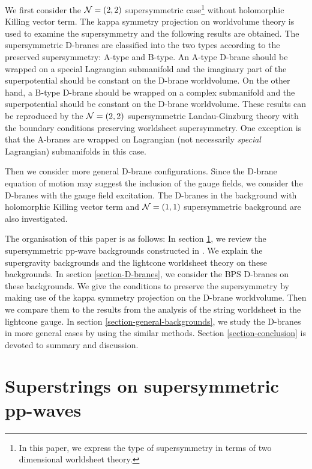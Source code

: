 \documentclass[a4paper,12pt]{article}
\numberwithin{equation}{section}
\begin{document}
We first consider the ${\cal N}=(2,2)$ supersymmetric case\footnote{
In this paper, we express the type of supersymmetry in terms of two
dimensional worldsheet theory.
} without
holomorphic Killing vector term. 
The kappa symmetry projection on worldvolume theory is used to examine
the supersymmetry and the following results are obtained.
The supersymmetric D-branes are classified into the two types according
to the preserved supersymmetry: A-type and B-type.
An A-type D-brane should be wrapped on a special Lagrangian submanifold and
the imaginary part of the superpotential should be constant on the
D-brane worldvolume. 
On the other hand, a B-type D-brane should be wrapped on a complex
submanifold and the superpotential should be constant on the D-brane
worldvolume. 
These results can be reproduced by the 
${\cal N} = (2,2)$ supersymmetric Landau-Ginzburg theory with the 
boundary conditions preserving worldsheet supersymmetry.
One exception is that the A-branes are wrapped on Lagrangian
(not necessarily {\em special} Lagrangian) submanifolds in this case.

Then we consider more general D-brane configurations.
Since the D-brane equation of motion may suggest the inclusion of the gauge
fields, we consider the D-branes with the gauge field excitation. 
The D-branes in the background with holomorphic Killing vector term and
${\cal N} = (1,1)$ supersymmetric background are also investigated.

The organisation of this paper is as follows: In section \ref{section-review},
we review the supersymmetric pp-wave backgrounds constructed in
\cite{Maldacena:2002fy}. We explain
the supergravity backgrounds and the lightcone worldsheet theory on these 
backgrounds. In section \ref{section-D-branes}, we consider the BPS D-branes
on these backgrounds. We give the conditions to preserve the
supersymmetry by making use of the kappa symmetry projection on the
D-brane worldvolume.
Then we compare them to the results from the
analysis of the string worldsheet in the lightcone gauge.
In section \ref{section-general-backgrounds}, we study the D-branes in
more general cases by using the similar methods.
Section \ref{section-conclusion} is devoted to summary and discussion.


\section{Superstrings on supersymmetric pp-waves}
\label{section-review}
\end{document}
